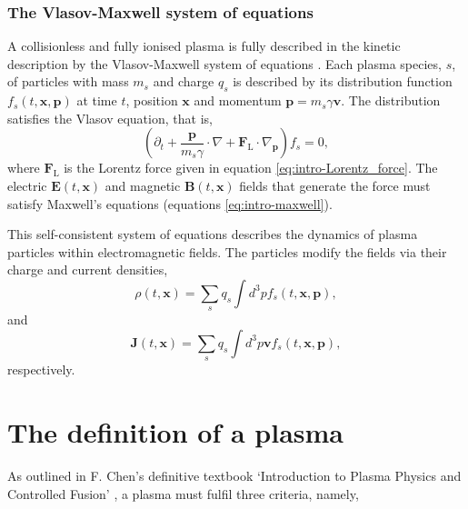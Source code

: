 \subsubsection{The Vlasov-Maxwell system of equations}
A collisionless and fully ionised plasma is fully described in the kinetic description by the Vlasov-Maxwell system of equations \cite{derouillatSmileiCollaborativeOpensource2018}. Each plasma species, $s$, of particles with mass $m_s$ and charge $q_s$ is described by its distribution function $f_s(t,\mathbf{x},\mathbf{p})$ at time $t$, position $\mathbf{x}$ and momentum $\mathbf{p} = m_s \gamma \mathbf{v}$. The distribution satisfies the Vlasov equation, that is,
\begin{equation}\label{eq:intro-vlasov}
	(\partial_t + \frac{\mathbf{p}}{m_s\gamma} \cdot \nabla + \mathbf{F}_\mathrm{L} \cdot \nabla_\mathbf{p})f_s = 0,
\end{equation}
where $\mathbf{F}_\mathrm{L}$ is the Lorentz force given in equation \ref{eq:intro-Lorentz_force}. The electric $\mathbf{E}(t,\mathbf{x})$ and magnetic $\mathbf{B}(t,\mathbf{x})$ fields that generate the force must satisfy Maxwell's equations (equations \ref{eq:intro-maxwell}).

This self-consistent system of equations describes the dynamics of plasma particles within electromagnetic fields. The particles modify the fields via their charge and current densities,
\begin{equation}
	\rho(t,\mathbf{x}) = \sum_s q_s \int d^3pf_s(t,\mathbf{x},\mathbf{p}),
\end{equation}
and 
\begin{equation}
	\mathbf{J}(t,\mathbf{x}) = \sum_s q_s \int d^3p\mathbf{v}f_s(t,\mathbf{x},\mathbf{p}),
\end{equation}
respectively.

\section{\label{sec:plasma_def}The definition of a plasma}
As outlined in F. Chen's definitive textbook `Introduction to Plasma Physics and Controlled Fusion' \cite{chenIntroductionPlasmaPhysics2016}, a plasma must fulfil three criteria, namely,

